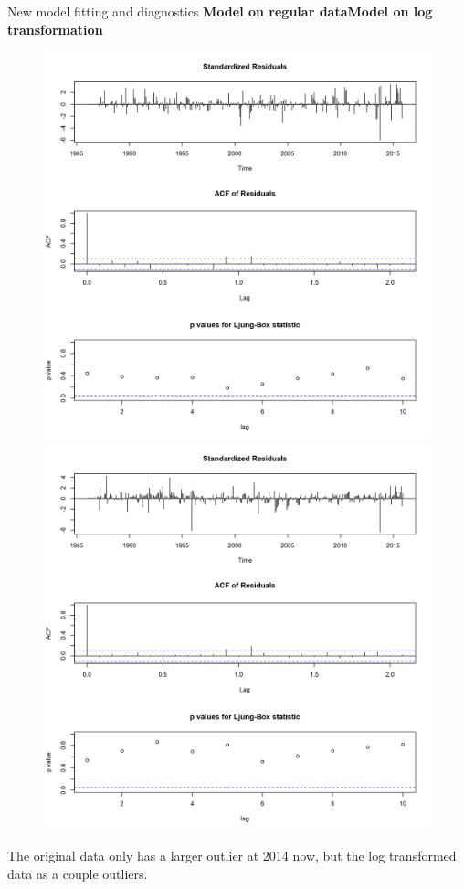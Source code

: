 \documentclass[xcolor=dvipsnames]{beamer}
\begin{document}
\begin{frame}{New model fitting and diagnostics}
\small{\textbf{Model on regular data}\hfill \textbf{Model on log transformation}}
\vspace{-1em}
\begin{figure}
\centering\includegraphics[width=.47\linewidth]{../outlier/tsdiag-fitV-plot-outlier.png} \hfill \centering\includegraphics[width=.47\linewidth]{../outlier/tsdiag-fitLV-plot-outlier.png}
\end{figure}

\vfill 
\footnotesize The original data only has a larger outlier at 2014 now, but the log transformed data as a couple outliers.  
\end{frame}
\end{document}
